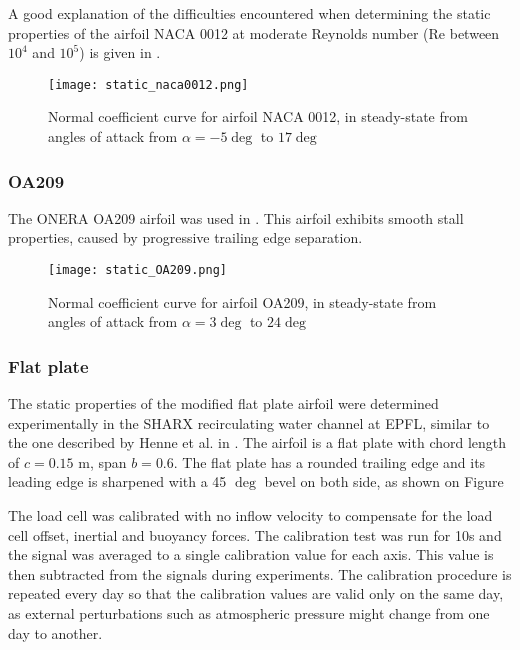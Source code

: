 A good explanation of the difficulties encountered when determining the static properties of the airfoil NACA 0012 at moderate Reynolds number (Re between $10^4$ and $10^5$) is given in \cite{tank_possibility_2017}.

\begin{wrapfigure}{r}{10cm}
    \centering
    \texttt{[image: static\_naca0012.png]}
    \caption{Normal coefficient curve for airfoil NACA 0012, in steady-state from angles of attack from $\alpha=-5 \deg$ to $17 \deg$}
    \label{fig:static_flatplate}
\end{wrapfigure}

\subsubsection{OA209}

The ONERA OA209 airfoil was used in \cite{mulleners_onset_2010}. This airfoil exhibits smooth stall properties, caused by progressive trailing edge separation.

\begin{wrapfigure}{r}{10cm}
    \centering
    \texttt{[image: static\_OA209.png]}
    \caption{Normal coefficient curve for airfoil OA209, in steady-state from angles of attack from $\alpha=3 \deg$ to $24 \deg$}
    \label{fig:static_flatplate}
\end{wrapfigure}

\subsubsection{Flat plate}

The static properties of the modified flat plate airfoil were determined experimentally in the SHARX recirculating water channel at EPFL, similar to the one described by Henne et al. in \cite{henne_dynamic_2018}. The airfoil is a flat plate with chord length of $c=0.15$ m, span $b=0.6$. The flat plate has a rounded trailing edge and its leading edge is sharpened with a 45 $\deg$ bevel on both side, as shown on Figure  



The load cell was calibrated with no inflow velocity to compensate for the load cell offset, inertial and  buoyancy forces. The calibration test was run for 10s and the signal was averaged to a single calibration value for each axis. This value is then subtracted from the signals during experiments. The calibration procedure is repeated every day so that the calibration values are valid only on the same day, as external perturbations such as atmospheric pressure might change from one day to another. 

